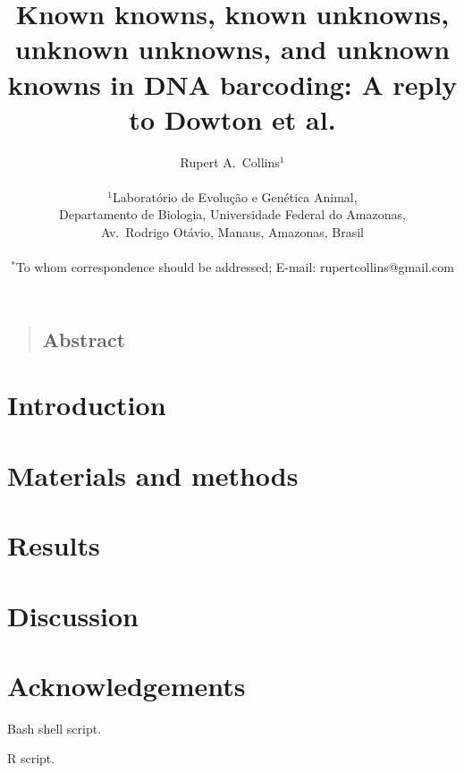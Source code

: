 \documentclass[12pt]{article}
\title{\bf Known knowns, known unknowns, unknown unknowns, and unknown knowns in DNA barcoding: A reply to Dowton et al.}
\author
{Rupert A.\ Collins$^{1}$\\
\\
\normalsize{$^{1}$Laborat\'orio de Evolu\c c\~ao e Gen\'etica Animal,}\\
\normalsize{Departamento de Biologia, Universidade Federal do Amazonas,}\\
\normalsize{Av.\ Rodrigo Ot\'avio, Manaus, Amazonas, Brasil}\\
\\
\normalsize{$^\ast$To whom correspondence should be addressed; E-mail:  rupertcollins@gmail.com}
}
\date{}
\newenvironment{sciabstract}{%
\begin{quote} }
{\end{quote}}
\begin{document}
 
\maketitle 

\begin{sciabstract}
  \subsection*{Abstract}


\end{sciabstract}


\section*{Introduction}


\section*{Materials and methods}


\section*{Results}


\section*{Discussion}

\section*{Acknowledgements}





\clearpage
\newpage

\begin{Supplementary Data}
\caption{Bash shell script. }
\label{suppl:bash}
\end{Supplementary Data}

\begin{Supplementary Data}
\caption{R script. }
\label{suppl:R}
\end{Supplementary Data}
\end{document}
